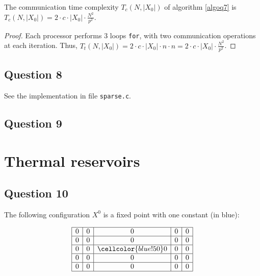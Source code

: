 \begin{prop}
 The communication time complexity $T_c(N,|X_0|)$ of algorithm \ref{algoq7} is $T_c(N,|X_0|) = 2 \cdot c \cdot |X_0| \cdot \frac{N^2}{p^2}$.
\end{prop}

\begin{proof}
 Each processor performs 3 loops \texttt{for}, with two communication operations at each iteration. Thus, $T_t(N,|X_0|) = 2 \cdot c \cdot |X_0| \cdot n \cdot n = 2 \cdot c \cdot |X_0| \cdot \frac{N^2}{p^2}$. 
\end{proof}


\subsection*{Question 8}

See the implementation in file \texttt{sparse.c}.


\subsection*{Question 9}


\section{Thermal reservoirs}


\subsection*{Question 10}
 
\begin{ex}
  The following configuration $X^0$ is a fixed point with one constant (in blue):
  
  \[\begin{array}{ | c | c | c | c | c |} \hline
    0 & 0 & 0 & 0 & 0\\ \hline
    0 & 0 & 0 & 0 & 0\\ \hline
    0 & 0 & \cellcolor{blue!50} 0 & 0 & 0\\ \hline
    0 & 0 & 0 & 0 & 0\\ \hline
    0 & 0 & 0 & 0 & 0\\ \hline
  \end{array}\]
\end{ex}

